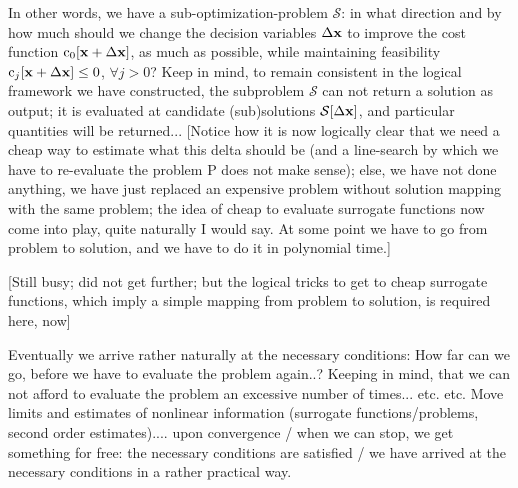 \documentclass[11pt]{article}
\begin{document}
In other words, we have a sub-optimization-problem $\mathcal{S}$: in what direction and by how much should we change the decision variables $\Delta \mathbf{x}$ to improve the cost function $\textrm{c}_0[\mathbf{x} + \Delta \mathbf{x}]$, as much as possible, while maintaining feasibility $\textrm{c}_j[\mathbf{x} + \Delta \mathbf{x}] \leq 0$, $\forall j > 0 $? Keep in mind, to remain consistent in the logical framework we have constructed, the subproblem $\mathcal{S}$ can not return a solution as output; it is evaluated at candidate (sub)solutions $\mathcal{S}[\Delta \mathbf{x}]$, and particular quantities will be returned... [Notice how it is now logically clear that we need a cheap way to estimate what this delta should be (and a line-search by which we have to re-evaluate the problem P does not make sense); else, we have not done anything, we have just replaced an expensive problem without solution mapping with the same problem; the idea of cheap to evaluate surrogate functions now come into play, quite naturally I would say. At some point we have to go from problem to solution, and we have to do it in polynomial time.]

[Still busy; did not get further; but the logical tricks to get to cheap surrogate functions, which imply a simple mapping from problem to solution, is required here, now]

Eventually we arrive rather naturally at the necessary conditions: How far can we go, before we have to evaluate the problem again..? Keeping in mind, that we can not afford to evaluate the problem an excessive number of times... etc. etc. Move limits and estimates of nonlinear information (surrogate functions/problems, second order estimates).... upon convergence / when we can stop, we get something for free: the necessary conditions are satisfied / we have arrived at the necessary conditions in a rather practical way.


 
 
\end{document}
